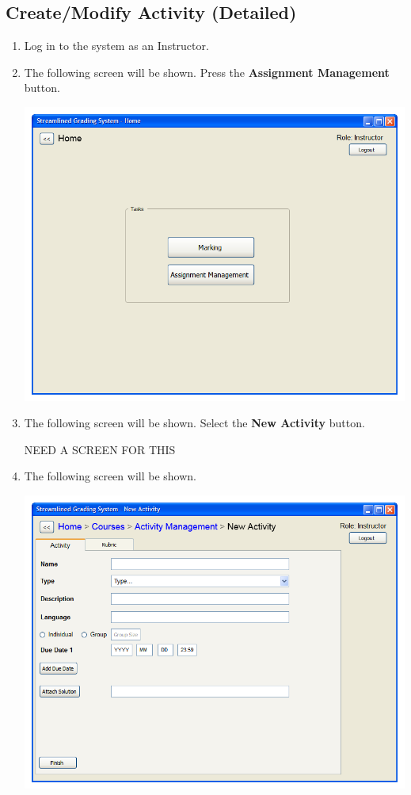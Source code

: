 \documentclass{article}
\begin{document}
\subsection{Create/Modify Activity (Detailed)}
\begin{enumerate}
  \item Log in to the system as an Instructor.
  \item The following screen will be shown.  Press the \textbf{Assignment Management} button.
  \begin{center} 
   \includegraphics[scale=0.55]{../images/UIMockups/pngs/LandingPage}
  \end{center}
  \item The following screen will be shown. Select the \textbf{New Activity} button.
  \begin{center}
  NEED A SCREEN FOR THIS
  \end{center}
  \item The following screen will be shown.
   \begin{center} 
   \includegraphics[scale=0.55]{../images/UIMockups/pngs/newActivity}

\end{center}
\end{enumerate}
\end{document}
